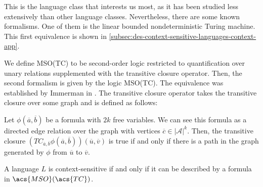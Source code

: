 This is the language class that interests us most, as it has been studied less extensively than other language classes.
Nevertheless, there are some known formalisms.
One of them is the linear bounded nondeterministic Turing machine.
This first equivalence is shown in \cref{subsec:des-context-sensitive-languages-context-app}.

We define \acs{MSO}(\acs{TC}) to be second-order logic restricted to quantification over unary relations supplemented with the transitive closure operator.
Then, the second formalism is given by the logic \acs{MSO}(\acs{TC}).
The equivalence was established by Immerman in \cite{Immerman1987}.
The transitive closure operator takes the transitive closure over some graph and is defined as follows:

\begin{define}
    Let $\phi\left(\overline{a}, \overline{b}\right)$ be a formula with $2k$ free variables.
    We can see this formula as a directed edge relation over the graph with vertices $\overline{c} \in | \mathcal{A} |^{k}$.
    Then, the transitive closure $\left(TC_{\overline{a}, \overline{b}}\phi\left(\overline{a}, \overline{b}\right)\right)\left(\overline{u}, \overline{v}\right)$ is true if and only if there is a path in the graph generated by $\phi$ from $\overline{u}$ to $\overline{v}$.
\end{define}

\begin{theorem}
    \label{thm:contextsensitveMSOTC}
    A language $L$ is context-sensitive if and only if it can be described by a formula in $\acs{MSO}(\acs{TC})$.
\end{theorem}

